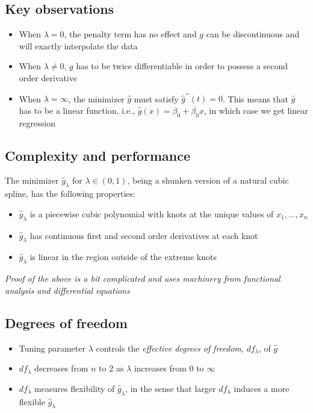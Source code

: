 \documentclass[]{article}
\begin{document}
\subsection{Key observations}\label{key-observations}

\begin{itemize}
\item
  When \(\lambda=0\), the penalty term has no effect and \(g\) can be
  discontinuous and will exactly interpolate the data
\item
  When \(\lambda\neq0\), \(g\) has to be twice differentiable in order
  to possess a second order derivative
\item
  When \(\lambda=\infty\), the minimizer \(\hat{g}\) must satisfy
  \(\hat{g}^{\prime\prime}\left( t\right) =0\). This means that
  \(\hat {g}\) has to be a linear function, i.e.,
  \(\hat{g}\left( x\right) =\beta _{0}+\beta_{0}x\), in which case we
  get linear regression
\end{itemize}

\subsection{Complexity and
performance}\label{complexity-and-performance}

The minimizer \(\hat{g}_{\lambda}\) for \(\lambda\in\left( 0,1\right)\),
being a shunken version of a natural cubic spline, has the following
properties:

\begin{itemize}
\item
  \(\hat{g}_{\lambda}\) is a piecewise cubic polynomial with knots at
  the unique values of \(x_{1},...,x_{n}\)
\item
  \(\hat{g}_{\lambda}\) has continuous first and second order
  derivatives at each knot
\item
  \(\hat{g}_{\lambda}\) is linear in the region outside of the extreme
  knots
\end{itemize}

\emph{Proof of the above is a bit complicated and uses machinery from
functional analysis and differential equations}

\subsection{Degrees of freedom}\label{degrees-of-freedom}

\begin{itemize}
\item
  Tuning parameter \(\lambda\) controls the \emph{effective degrees of
  freedom}, \(df_{\lambda}\), of \(\hat{g}\)
\item
  \(df_{\lambda}\) decreases from \(n\) to \(2\) as \(\lambda\)
  increases from \(0\) to \(\infty\)
\item
  \(df_{\lambda}\) measures flexibility of \(\hat {g}_{\lambda}\), in
  the sense that larger \(df_{\lambda}\) induces a more flexible
  \(\hat{g}_{\lambda}\)
\end{itemize}
\end{document}
